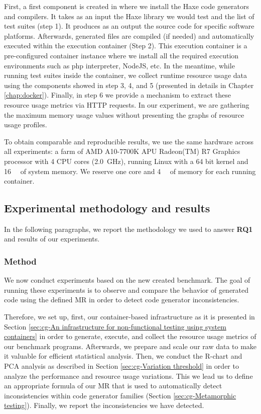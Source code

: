 First, a first component is created in where we install the Haxe code generators and compilers. It takes as an input the Haxe library we would test and the list of test suites (step 1). It produces as an output the source code for specific software platforms. Afterwards, generated files are compiled (if needed) and automatically executed within the execution container (Step 2). This execution container is a pre-configured container instance where we install all the required execution environments such as php interpreter, NodeJS, etc. 
In the meantime, while running test suites inside the container, we collect runtime resource usage data using the components showed in step 3, 4, and 5 (presented in details in Chapter \ref{chap:docker}).
Finally, in step 6 we provide a mechanism to extract these resource usage metrics via HTTP requests. In our experiment, we are gathering the maximum memory usage values without presenting the graphs of resource usage profiles.

To obtain comparable and reproducible results, we use the same hardware across all experiments: a farm of AMD A10-7700K APU Radeon(TM) R7 Graphics processor with 4 CPU cores (\SI{2.0}{\GHz}), running Linux with a 64 bit kernel and \SI{16}{\giga\byte} of system memory. We reserve one core and \SI{4}{\giga\byte} of memory for each running container. 

\subsection{Experimental methodology and results}
In the following paragraphs, we report the methodology we used to answer \textbf{RQ1} and results of our experiments. 

\subsubsection{Method}
We now conduct experiments based on the new created benchmark. 
The goal of running these experiments is to observe and compare the behavior of generated code using the defined MR in order to detect code generator inconsistencies.

Therefore, we set up, first, our container-based infrastructure as it is presented in Section \ref{sec:cg-An infrastructure for non-functional testing using system containers} in order to generate, execute, and collect the resource usage metrics of our benchmark programs.
Afterwards, we prepare and scale our raw data to make it valuable for efficient statistical analysis. Then, we conduct the R-chart and PCA analysis as described in Section \ref{sec:cg-Variation threshold} in order to analyze the performance and resource usage variations. This we lead us to define an appropriate formula of our MR that is used to automatically detect inconsistencies within code generator families (Section \ref{sec:cg-Metamorphic testing}). Finally, we report the inconsistencies we have detected.


